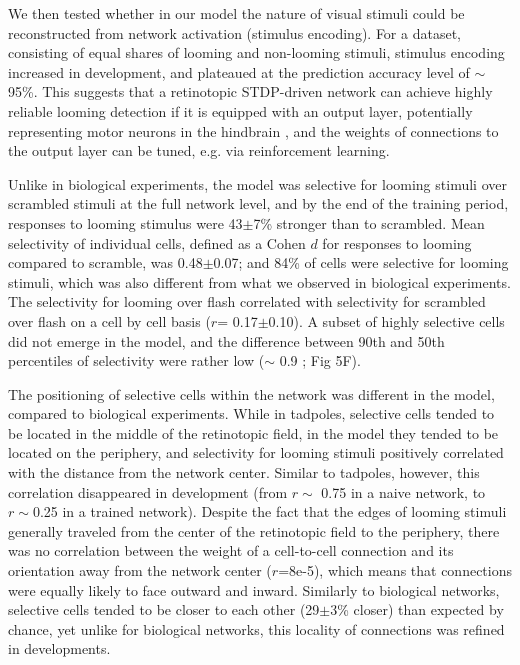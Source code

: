 \documentclass{article}
\begin{document}
We then tested whether in our model the nature of visual stimuli could be reconstructed from network activation (stimulus encoding). For a dataset, consisting of equal shares of looming and non-looming stimuli, stimulus encoding increased in development, and plateaued at the prediction accuracy level of $\sim$95\%. This suggests that a retinotopic STDP-driven network can achieve highly reliable looming detection if it is equipped with an output layer, potentially representing motor neurons in the hindbrain \citep{helmbrecht2018topography}, and the weights of connections to the output layer can be tuned, e.g. via reinforcement learning.

Unlike in biological experiments, the model was selective for looming stimuli over scrambled stimuli at the full network level, and by the end of the training period, responses to looming stimulus were 43$\pm$7\% stronger than to scrambled. Mean selectivity of individual cells, defined as a Cohen $d$ for responses to looming compared to scramble, was 0.48$\pm$0.07; and 84\% of cells were selective for looming stimuli, which was also different from what we observed in biological experiments. The selectivity for looming over flash correlated with selectivity for scrambled over flash on a cell by cell basis ($r$= 0.17$\pm$0.10). A subset of highly selective cells did not emerge in the model, and the difference between 90th and 50th percentiles of selectivity were rather low ($\sim$ 0.9 ; Fig 5F).

The positioning of selective cells within the network was different in the model, compared to biological experiments. While in tadpoles, selective cells tended to be located in the middle of the retinotopic field, in the model they tended to be located on the periphery, and selectivity for looming stimuli positively correlated with the distance from the network center. Similar to tadpoles, however, this correlation disappeared in development (from $r\sim$ 0.75 in a naive network, to $r\sim$0.25 in a trained network). Despite the fact that the edges of looming stimuli generally traveled from the center of the retinotopic field to the periphery, there was no correlation between the weight of a cell-to-cell connection and its orientation away from the network center ($r$=8e-5), which means that connections were equally likely to face outward and inward. Similarly to biological networks, selective cells tended to be closer to each other (29$\pm$3\% closer) than expected by chance, yet unlike for biological networks, this locality of connections was refined in developments.
\end{document}
